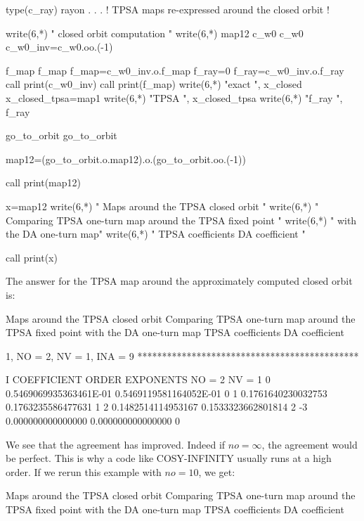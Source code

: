 \documentclass{hitec}     %
\begin{document}
{{\begin{code}
type(c_ray) rayon
      .
      .
      .
! TPSA maps re-expressed around the closed orbit !

write(6,*) " closed orbit computation "
write(6,*) map12%
c_w0%
c_w0%
c_w0_inv=c_w0.oo.(-1)

f_map%
f_map%
f_map=c_w0_inv.o.f_map
f_ray=0
f_ray=c_w0_inv.o.f_ray
call print(c_w0_inv)
call print(f_map)
write(6,*) "exact ", x_closed
x_closed_tpsa=map1%
write(6,*) "TPSA  ", x_closed_tpsa
write(6,*) "f_ray ", f_ray%

go_to_orbit%
go_to_orbit%

map12=(go_to_orbit.o.map12).o.(go_to_orbit.oo.(-1))

call print(map12)

x=map12%
 write(6,*)  "    Maps around the TPSA closed orbit "
 write(6,*)  "    Comparing TPSA one-turn map around the TPSA fixed point "
write(6,*)  "    with the DA one-turn map"
 write(6,*)  "    TPSA coefficients      DA coefficient "

 call print(x)
 \end{code}

The answer for the TPSA map around the approximately computed closed orbit is:

\begin{code}
      Maps around the TPSA closed orbit
     Comparing TPSA one-turn map around the TPSA fixed point
     with the DA one-turn map
     TPSA coefficients      DA coefficient

          1, NO =    2, NV =    1, INA =    9
 *********************************************

    I  COEFFICIENT          ORDER   EXPONENTS
      NO =     2      NV =     1
   0  0.5469069935363461E-01  0.5469119581164052E-01   0
   1  0.1761640230032753      0.1763235586477631       1
   2  0.1482514114953167      0.1533323662801814       2
    -3   0.000000000000000       0.000000000000000       0
\end{code}
\label{p:tpage}  

We see that the agreement has improved. Indeed if $no=\infty $, the agreement would be perfect. This is why a code like COSY-INFINITY usually runs at a high order.
If  we rerun this example with $no=10$, we get:

\begin{code}
     Maps around the TPSA closed orbit
     Comparing TPSA one-turn map around the TPSA fixed point
     with the DA one-turn map
     TPSA coefficients      DA coefficient


\end{code}}}
\end{document}
